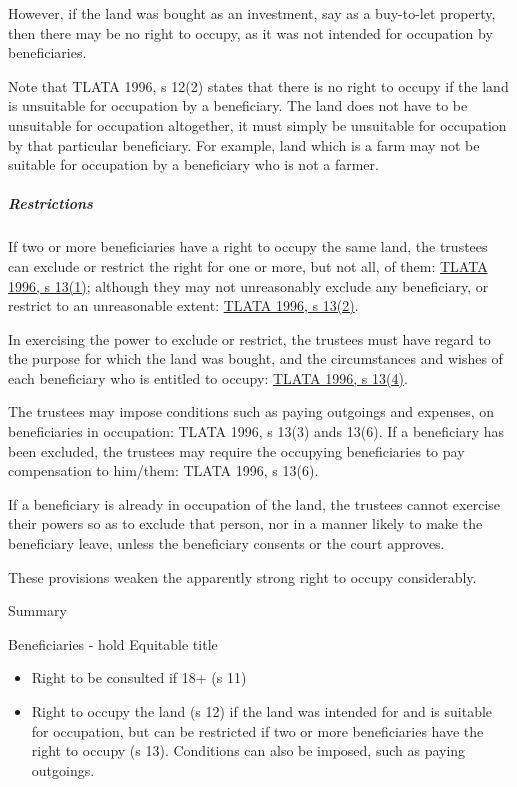 \documentclass[
]{article}
\providecommand{\tightlist}{%
  \setlength{\itemsep}{0pt}\setlength{\parskip}{0pt}}
\newenvironment{env-d6ce83a0-f7a8-46b6-be95-b1235f1feb63}
{
    \savenotes\tcolorbox[blanker,breakable,left=5pt,borderline west={2pt}{-4pt}{gray}]
}
{
    \endtcolorbox\spewnotes
}
\begin{document}
However, if the land was bought as an investment, say as a buy-to-let
property, then there may be no right to occupy, as it was not intended
for occupation by beneficiaries.

Note that TLATA 1996, s 12(2) states that there is no right to occupy if
the land is unsuitable for occupation by a beneficiary. The land does
not have to be unsuitable for occupation altogether, it must simply be
unsuitable for occupation by that particular beneficiary. For example,
land which is a farm may not be suitable for occupation by a beneficiary
who is not a farmer.

\hypertarget{restrictions}{%
\subparagraph{Restrictions}\label{restrictions}}

If two or more beneficiaries have a right to occupy the same land, the
trustees can exclude or restrict the right for one or more, but not all,
of them:
\href{https://www.legislation.gov.uk/ukpga/1996/47/section/13}{TLATA
1996, s 13(1)}; although they may not unreasonably exclude any
beneficiary, or restrict to an unreasonable extent:
\href{https://www.legislation.gov.uk/ukpga/1996/47/section/13}{TLATA
1996, s 13(2)}.

In exercising the power to exclude or restrict, the trustees must have
regard to the purpose for which the land was bought, and the
circumstances and wishes of each beneficiary who is entitled to occupy:
\href{https://www.legislation.gov.uk/ukpga/1996/47/section/13}{TLATA
1996, s 13(4)}.

The trustees may impose conditions such as paying outgoings and
expenses, on beneficiaries in occupation: TLATA 1996, s 13(3) ands
13(6). If a beneficiary has been excluded, the trustees may require the
occupying beneficiaries to pay compensation to him/them: TLATA 1996, s
13(6).

If a beneficiary is already in occupation of the land, the trustees
cannot exercise their powers so as to exclude that person, nor in a
manner likely to make the beneficiary leave, unless the beneficiary
consents or the court approves.

These provisions weaken the apparently strong right to occupy
considerably.

\begin{env-d6ce83a0-f7a8-46b6-be95-b1235f1feb63}

Summary

Beneficiaries - hold Equitable title

\begin{itemize}
\tightlist
\item
  Right to be consulted if 18+ (s 11)
\item
  Right to occupy the land (s 12) if the land was intended for and is
  suitable for occupation, but can be restricted if two or more
  beneficiaries have the right to occupy (s 13). Conditions can also be
  imposed, such as paying outgoings.
\end{itemize}

\end{env-d6ce83a0-f7a8-46b6-be95-b1235f1feb63}
\end{document}
